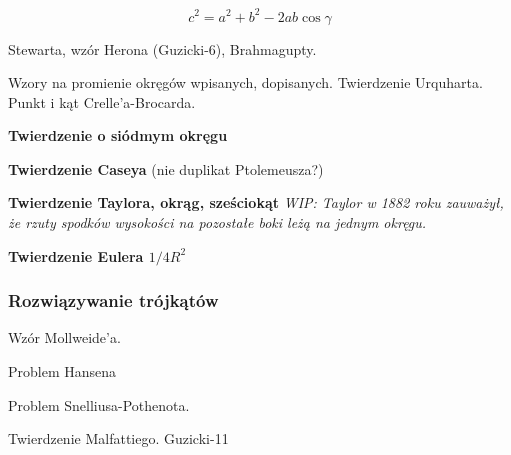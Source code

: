 $$c^2 = a^2 + b^2 - 2ab \cos \gamma$$

Stewarta, wzór Herona (Guzicki-6), Brahmagupty.

Wzory na promienie okręgów wpisanych, dopisanych.
Twierdzenie Urquharta.
Punkt i kąt Crelle'a-Brocarda.

\textbf{Twierdzenie o siódmym okręgu}

\textbf{Twierdzenie Caseya} (nie duplikat Ptolemeusza?)

\textbf{Twierdzenie Taylora, okrąg, sześciokąt}
{
    \emph{WIP: Taylor w 1882 roku zauważył, że rzuty spodków wysokości na pozostałe boki leżą na jednym okręgu.}
}

\textbf{Twierdzenie Eulera $1/4R^2$}


\subsubsection{Rozwiązywanie trójkątów}
Wzór Mollweide'a.
%

Problem Hansena
%

Problem Snelliusa-Pothenota.
%



Twierdzenie Malfattiego.
Guzicki-11

%